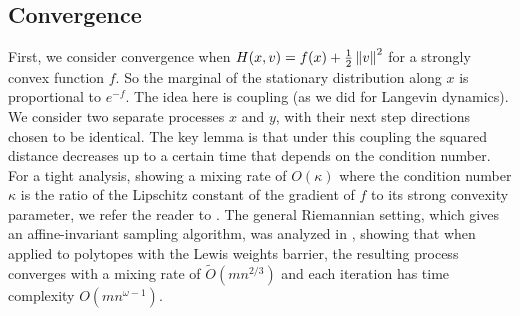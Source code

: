 \subsection*{Convergence}

First, we consider convergence when $H(x,v)=f(x)+\frac{1}{2}\left\Vert v\right\Vert^{2}$
for a strongly convex function $f$. So the marginal of the stationary
distribution along $x$ is proportional to $e^{-f}$. The idea here
is coupling (as we did for Langevin dynamics). We consider two separate
processes $x$ and $y$, with their next step directions chosen to
be identical. The key lemma is that under this coupling the squared
distance decreases up to a certain time that depends on the condition
number. For a tight analysis, showing a mixing rate of $O(\kappa)$
where the condition number $\kappa$ is the ratio of the Lipschitz
constant of the gradient of $f$ to its strong convexity parameter,
we refer the reader to \cite{chen2022optimal}. The general Riemannian
setting, which gives an affine-invariant sampling algorithm, was analyzed
in \cite{LV2022geodesic,LV18riemannian}, showing that when applied
to polytopes with the Lewis weights barrier, the resulting process
converges with a mixing rate of $\tilde{O}(mn^{2/3})$ and each iteration
has time complexity $O(mn^{\omega-1})$. 
